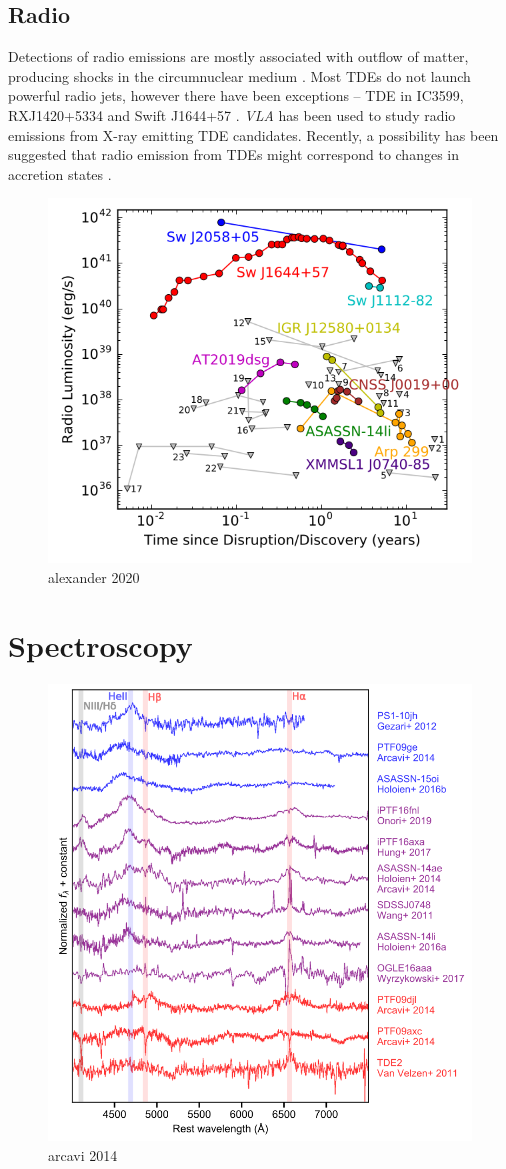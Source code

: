 \documentclass{tda}
\begin{document}
\subsection{Radio}

Detections of radio emissions are mostly associated with outflow of matter, producing shocks in the circumnuclear medium \cite{bonnerot_first_2021}. Most TDEs do not launch powerful radio jets, however there have been exceptions -- TDE in IC3599, RXJ1420+5334 and Swift J1644+57 \cite{komossa_tidal_2015}. \textit{VLA} has been used to study radio emissions from X-ray emitting TDE candidates. Recently, a possibility has been suggested that radio emission from TDEs might correspond to changes in accretion states \cite{horesh_delayed_2021}.

\begin{figure} [h]
	\centering
	\includegraphics[width=.5\linewidth]{./images/alexander2020.png}
	\caption{alexander 2020}
\end{figure}

\newpage
\section{Spectroscopy}

\begin{figure}
	\centering
	\includegraphics[width=.55\linewidth]{./images/arcavi2014.png}
	\caption{arcavi 2014}
\end{figure}
\end{document}
